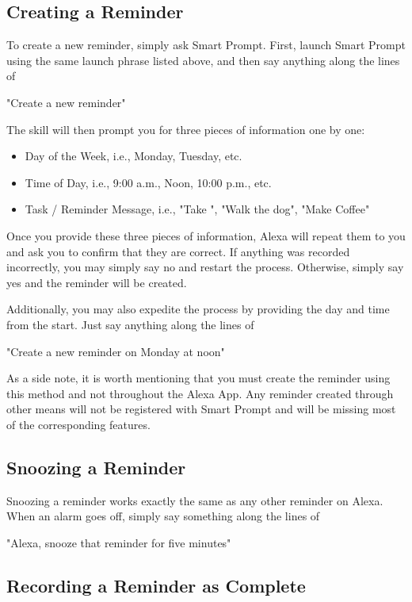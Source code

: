 \documentclass[11pt, oneside]{article}
\begin{document}
\subsection{Creating a Reminder}

To create a new reminder, simply ask Smart Prompt. First, launch Smart Prompt using the same launch phrase listed above, and then say anything along the lines of
\begin{center}
"Create a new reminder"
\end{center}
The skill will then prompt you for three pieces of information one by one:
\begin{itemize}
    \item Day of the Week, i.e., Monday, Tuesday, etc.
    \item Time of Day, i.e., 9:00 a.m., Noon, 10:00 p.m., etc.
    \item Task / Reminder Message, i.e., "Take ", "Walk the dog", "Make Coffee"
\end{itemize}
Once you provide these three pieces of information, Alexa will repeat them to you and ask you to confirm that they are correct. If anything was recorded incorrectly, you may simply say no and restart the process. Otherwise, simply say yes and the reminder will be created.

Additionally, you may also expedite the process by providing the day and time from the start. Just say anything along the lines of
\begin{center}
"Create a new reminder on Monday at noon"
\end{center}
As a side note, it is worth mentioning that you must create the reminder using this method and not throughout the Alexa App. Any reminder created through other means will not be registered with Smart Prompt and will be missing most of the corresponding features.

\subsection{Snoozing a Reminder}

Snoozing a reminder works exactly the same as any other reminder on Alexa. When an alarm goes off, simply say something along the lines of
\begin{center}
"Alexa, snooze that reminder for five minutes"
\end{center}

\subsection{Recording a Reminder as Complete}
\end{document}
